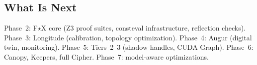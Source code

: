 \subsection{What Is Next}

Phase~2: F$\star$X core (Z3 proof suites, consteval infrastructure, reflection checks).
Phase~3: Longitude (calibration, topology optimization).
Phase~4: Augur (digital twin, monitoring).
Phase~5: Tiers~2--3 (shadow handles, CUDA Graph).
Phase~6: Canopy, Keepers, full Cipher.
Phase~7: model-aware optimizations.
